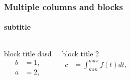 \begin{frame}
	\frametitle{Multiple columns and blocks}%
	\framesubtitle{subtitle}
	\begin{columns}[t]
		\begin{block}{block title}
			dasd
			\begin{align}
					b & =  1,\\
					a & =  2,
			\end{align}
		\end{block}
		\pause
		\begin{block}{block title 2}
			\begin{align*}
					c & =  \int_{min}^{max} f(t) dt,
			\end{align*}
		\end{block}
	\end{columns}
\end{frame}